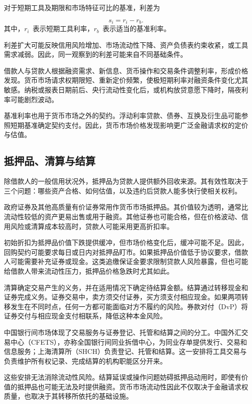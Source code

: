对于短期工具及期限和市场特征可比的基准，利差为

\begin{equation}
s_i=r_i-r_b.
\label{eq:ch7-money-market-spread}
\end{equation}
其中，$r_i$~表示短期工具利率，$r_b$~表示适当的基准利率。

利差扩大可能反映信用风险增加、市场流动性下降、资产负债表约束收紧，或工具需求减弱。因此，同一观察到的利差可能来自不同基础条件。

借款人与贷款人根据融资需求、新信息、货币操作和交易条件调整利率，形成价格发现。货币市场请求权期限短、重新定价频繁，使极短期利率对融资条件变化尤其敏感。纳税或报表日期前后、央行流动性变化后，或机构放贷意愿下降时，隔夜利率可能剧烈波动。

基准利率也用于货币市场之外的契约。浮动利率贷款、债券、互换及衍生品可能参照短期基准确定契约支付。因此，货币市场价格发现影响更广泛金融请求权的定价与估值。

\subsection{抵押品、清算与结算}

除借款人的一般信用状况外，抵押品为贷款人提供额外回收来源。其有效性取决于三个问题：哪些资产合格、如何估值，以及违约后贷款人能多快行使相关权利。

政府证券及其他高质量有价证券常用作货币市场抵押品。其价值较为透明，通常比流动性较低的资产更易出售或用于融资。其他证券也可能合格，但在价格波动、信用风险或清算成本较高时，贷款人可能采用更高折扣率。

初始折扣为抵押品价值下跌提供缓冲，但市场价格变化后，缓冲可能不足。因此，回购契约可能要求每日或日内对抵押品盯市。如果抵押品价值低于协议要求，借款人可能需要补充证券或现金。这类追缴保证金要求限制贷款人风险暴露，但也可能给借款人带来流动性压力，抵押品价格急跌时尤其如此。

清算确定交易产生的义务，并在适用情况下确定待结算金额。结算通过转移现金和证券完成义务。证券交易中，卖方须交付证券，买方须支付相应现金。如果两项转移发生在不同时点，任何一方都可能面临对方不履约的风险。券款对付（DvP）将证券交付与相应现金支付相联系，降低这种本金风险。

中国银行间市场体现了交易服务与证券登记、托管和结算之间的分工。中国外汇交易中心（CFETS），亦称全国银行间同业拆借中心，为同业存单提供发行、交易和信息服务；上海清算所（SHCH）负责登记、托管和结算。这一安排将工具交易与负责维护所有权记录、完成结算的机构职能区分开来。

这些安排无法消除流动性风险。结算延误或操作问题妨碍抵押品动用时，即使有价值的抵押品也可能无法及时提供融资。货币市场流动性因此不仅取决于金融请求权质量，也取决于其转移所依托的基础设施。

